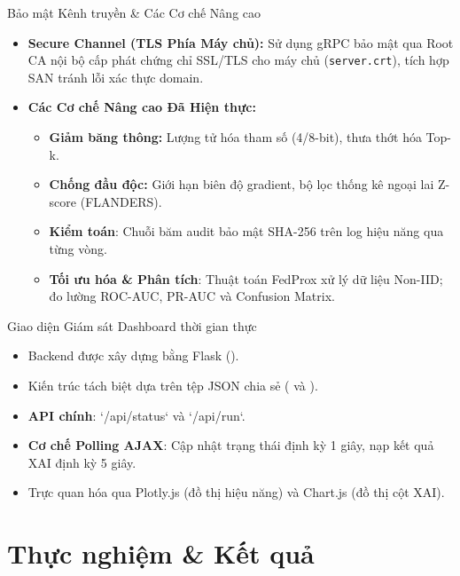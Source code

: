 \documentclass[10pt]{beamer}
\begin{document}
\begin{frame}{Bảo mật Kênh truyền \& Các Cơ chế Nâng cao}
    \begin{itemize}
        \item \textbf{Secure Channel (TLS Phía Máy chủ):}
        Sử dụng gRPC bảo mật qua Root CA nội bộ cấp phát chứng chỉ SSL/TLS cho máy chủ (\texttt{server.crt}), tích hợp SAN tránh lỗi xác thực domain.
        \item \textbf{Các Cơ chế Nâng cao Đã Hiện thực:}
        \begin{itemize}
            \item \textbf{Giảm băng thông:} Lượng tử hóa tham số (4/8-bit), thưa thớt hóa Top-k.
            \item \textbf{Chống đầu độc:} Giới hạn biên độ gradient, bộ lọc thống kê ngoại lai Z-score (FLANDERS).
            \item \textbf{Kiểm toán}: Chuỗi băm audit bảo mật SHA-256 trên log hiệu năng qua từng vòng.
            \item \textbf{Tối ưu hóa \& Phân tích}: Thuật toán FedProx xử lý dữ liệu Non-IID; đo lường ROC-AUC, PR-AUC và Confusion Matrix.
        \end{itemize}
    \end{itemize}
\end{frame}

\begin{frame}{Giao diện Giám sát Dashboard thời gian thực}
    \begin{itemize}
        \item Backend được xây dựng bằng Flask ().
        \item Kiến trúc tách biệt dựa trên tệp JSON chia sẻ ( và ).
        \item \textbf{API chính}: `/api/status` và `/api/run`.
        \item \textbf{Cơ chế Polling AJAX}: Cập nhật trạng thái định kỳ 1 giây, nạp kết quả XAI định kỳ 5 giây.
        \item Trực quan hóa qua Plotly.js (đồ thị hiệu năng) và Chart.js (đồ thị cột XAI).
    \end{itemize}
\end{frame}

\section{Thực nghiệm \& Kết quả}
\end{document}

